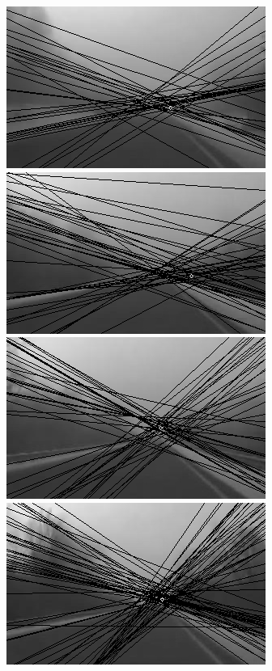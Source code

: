 \documentclass[12pt]{report}
\begin{document}
\begin{figure}
\begin{minipage}[c]{0.5\linewidth}
	\includegraphics[scale=\imTrackScale]{images/bF_0000_25.png}
	\includegraphics[scale=\imTrackScale]{images/bF_0020_25.png}
	\includegraphics[scale=\imTrackScale]{images/bF_0040_25.png}
	\includegraphics[scale=\imTrackScale]{images/bF_0060_25.png}
\end{minipage}
\begin{minipage}[c]{0.5\linewidth}

\end{minipage}
\end{figure}
\end{document}
